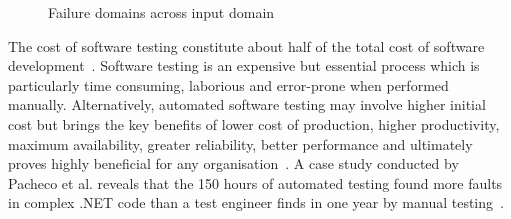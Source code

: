 \smallskip
\begin{figure} [H]
\centering
{}
\smallskip
\caption{Failure domains across input domain~\cite{chan1996proportional}}
\label{fig:patterns}
\end{figure} 


The cost of software testing constitute about half of the total cost of software development~\cite{myers2011art}. Software testing is an expensive but essential process which is particularly time consuming, laborious and error-prone when performed manually. Alternatively, automated software testing may involve higher initial cost but brings the key benefits of lower cost of production, higher productivity, maximum availability, greater reliability, better performance and ultimately proves highly beneficial for any organisation~\cite{Beizer1990}. A case study conducted by Pacheco et al. reveals that the 150 hours of automated testing found more faults in complex .NET code than a test engineer finds in one year by manual testing~\cite{pacheco2008finding}.

